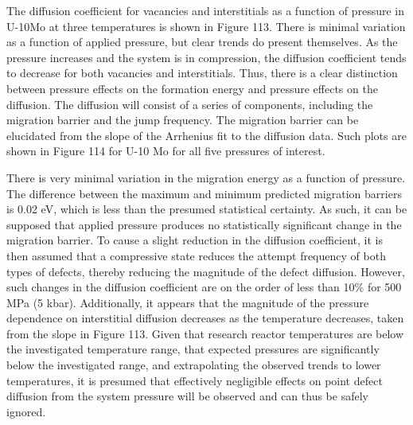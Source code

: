 \documentclass[11pt, oneside]{elsarticle}
\begin{document}
The diffusion coefficient for vacancies and interstitials as a function of pressure in U-10Mo at three temperatures is shown in Figure 113. There is minimal variation as a function of applied pressure, but clear trends do present themselves. As the pressure increases and the system is in compression, the diffusion coefficient tends to decrease for both vacancies and interstitials. Thus, there is a clear distinction between pressure effects on the formation energy and pressure effects on the diffusion. The diffusion will consist of a series of components, including the migration barrier and the jump frequency.  The migration barrier can be elucidated from the slope of the Arrhenius fit to the diffusion data. Such plots are shown in Figure 114 for U-10 Mo for all five pressures of interest. 

There is very minimal variation in the migration energy as a function of pressure. The difference between the maximum and minimum predicted migration barriers is 0.02 eV, which is less than the presumed statistical certainty. As such, it can be supposed that applied pressure produces no statistically significant change in the migration barrier. To cause a slight reduction in the diffusion coefficient, it is then assumed that a compressive state reduces the attempt frequency of both types of defects, thereby reducing the magnitude of the defect diffusion. However, such changes in the diffusion coefficient are on the order of less than 10\% for 500 MPa (5 kbar). Additionally, it appears that the magnitude of the pressure dependence on interstitial diffusion decreases as the temperature decreases, taken from the slope in Figure 113. Given that research reactor temperatures are below the investigated temperature range, that expected pressures are significantly below the investigated range, and extrapolating the observed trends to lower temperatures, it is presumed that effectively negligible effects on point defect diffusion from the system pressure will be observed and can thus be safely ignored. 
\end{document}
